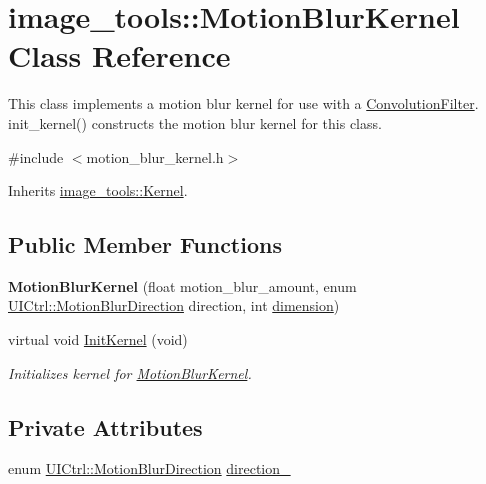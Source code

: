 \hypertarget{classimage__tools_1_1MotionBlurKernel}{}\section{image\+\_\+tools\+:\+:Motion\+Blur\+Kernel Class Reference}
\label{classimage__tools_1_1MotionBlurKernel}


This class implements a motion blur kernel for use with a \hyperlink{classimage__tools_1_1ConvolutionFilter}{Convolution\+Filter}. init\+\_\+kernel() constructs the motion blur kernel for this class.  




{\ttfamily \#include $<$motion\+\_\+blur\+\_\+kernel.\+h$>$}



Inherits \hyperlink{classimage__tools_1_1Kernel}{image\+\_\+tools\+::\+Kernel}.

\subsection*{Public Member Functions}
\begin{DoxyCompactItemize}
\item 
{\bfseries Motion\+Blur\+Kernel} (float motion\+\_\+blur\+\_\+amount, enum \hyperlink{classimage__tools_1_1UICtrl_a56d4f68bf91302769d7bc453d8d57cee}{U\+I\+Ctrl\+::\+Motion\+Blur\+Direction} direction, int \hyperlink{classimage__tools_1_1Kernel_a1235fc3f48da943eb72cc9067a5cf385}{dimension})\hypertarget{classimage__tools_1_1MotionBlurKernel_a552db2e63ad91789f05de30b61598f84}{}\label{classimage__tools_1_1MotionBlurKernel_a552db2e63ad91789f05de30b61598f84}

\item 
virtual void \hyperlink{classimage__tools_1_1MotionBlurKernel_a4e5bef533ab9aff6c8844c599e212f9c}{Init\+Kernel} (void)\hypertarget{classimage__tools_1_1MotionBlurKernel_a4e5bef533ab9aff6c8844c599e212f9c}{}\label{classimage__tools_1_1MotionBlurKernel_a4e5bef533ab9aff6c8844c599e212f9c}

\begin{DoxyCompactList}\small\item\em Initializes kernel for \hyperlink{classimage__tools_1_1MotionBlurKernel}{Motion\+Blur\+Kernel}. \end{DoxyCompactList}\end{DoxyCompactItemize}
\subsection*{Private Attributes}
\begin{DoxyCompactItemize}
\item 
enum \hyperlink{classimage__tools_1_1UICtrl_a56d4f68bf91302769d7bc453d8d57cee}{U\+I\+Ctrl\+::\+Motion\+Blur\+Direction} \hyperlink{classimage__tools_1_1MotionBlurKernel_ae10c96d114f1320d1158842ba452ef96}{direction\+\_\+}
\end{DoxyCompactItemize}
